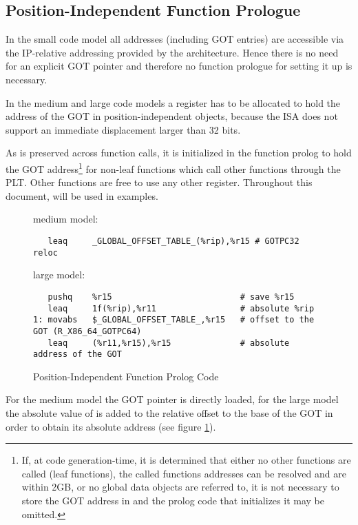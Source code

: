 \subsection{Position-Independent Function Prologue}

In the small code model all addresses (including GOT entries) are
accessible via the IP-relative addressing provided by the \xARCH
architecture.  Hence there is no need for an explicit GOT pointer and
therefore no function prologue for setting it up is necessary.

In the medium and large code models a register has to be allocated to hold the
address of the GOT in position-independent objects, because the \xARCH ISA does
not support an immediate displacement larger than 32 bits.

As  is preserved across function calls, it is initialized
in the function prolog to hold the GOT address\footnote{If, at code
generation-time, it is determined that either no other functions are
called (leaf functions), the called functions addresses can be
resolved and are within 2GB, or no global data objects are referred
to, it is not necessary to store the GOT address in  and
the prolog code that initializes it may be omitted.} for non-leaf
functions which call other functions through the PLT. Other functions
are free to use any other register. Throughout this document,
 will be used in examples.

\begin{figure}[H]
\Hrule
\caption{Position-Independent Function Prolog Code} \label{large_pic_prolog}
medium model:
\begin{footnotesize}
\begin{verbatim}
   leaq     _GLOBAL_OFFSET_TABLE_(%rip),%r15 # GOTPC32 reloc
\end{verbatim}
\end{footnotesize}
large model:
\begin{footnotesize}
\begin{verbatim}
   pushq    %r15                          # save %r15
   leaq     1f(%rip),%r11                 # absolute %rip
1: movabs   $_GLOBAL_OFFSET_TABLE_,%r15   # offset to the GOT (R_X86_64_GOTPC64)
   leaq     (%r11,%r15),%r15              # absolute address of the GOT
\end{verbatim}
\end{footnotesize}
\Hrule
\end{figure}%

For the medium model the GOT pointer is directly loaded, for the large
model
the absolute value of  is added to the relative offset to the base
of the GOT in order to obtain its absolute address (see figure
\ref{large_pic_prolog}).

